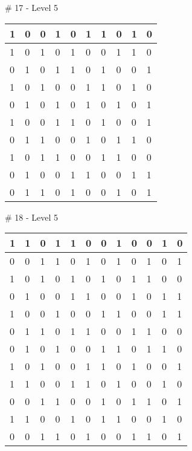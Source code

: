 \smallskip

\# 17 - Level 5 \newline
\begin{tabular}{|m{\collen}|m{\collen}|m{\collen}|m{\collen}|m{\collen}|m{\collen}|m{\collen}|m{\collen}|m{\collen}|m{\collen}|}
\hline
  1 & 0 & 0 & 1 & 0 & 1 & 1 & 0 & 1 & 0 \\
\hline
  1 & 0 & 1 & 0 & 1 & 0 & 0 & 1 & 1 & 0 \\
\hline
  0 & 1 & 0 & 1 & 1 & 0 & 1 & 0 & 0 & 1 \\
\hline
  1 & 0 & 1 & 0 & 0 & 1 & 1 & 0 & 1 & 0 \\
\hline
  0 & 1 & 0 & 1 & 0 & 1 & 0 & 1 & 0 & 1 \\
\hline
  1 & 0 & 0 & 1 & 1 & 0 & 1 & 0 & 0 & 1 \\
\hline
  0 & 1 & 1 & 0 & 0 & 1 & 0 & 1 & 1 & 0 \\
\hline
  1 & 0 & 1 & 1 & 0 & 0 & 1 & 1 & 0 & 0 \\
\hline
  0 & 1 & 0 & 0 & 1 & 1 & 0 & 0 & 1 & 1 \\
\hline
  0 & 1 & 1 & 0 & 1 & 0 & 0 & 1 & 0 & 1 \\
\hline
\end{tabular}


\smallskip

\# 18 - Level 5 \newline
\begin{tabular}{|m{\collen}|m{\collen}|m{\collen}|m{\collen}|m{\collen}|m{\collen}|m{\collen}|m{\collen}|m{\collen}|m{\collen}|m{\collen}|m{\collen}|}
\hline
  1 & 1 & 0 & 1 & 1 & 0 & 0 & 1 & 0 & 0 & 1 & 0 \\
\hline
  0 & 0 & 1 & 1 & 0 & 1 & 0 & 1 & 0 & 1 & 0 & 1 \\
\hline
  1 & 0 & 1 & 0 & 1 & 0 & 1 & 0 & 1 & 1 & 0 & 0 \\
\hline
  0 & 1 & 0 & 0 & 1 & 1 & 0 & 0 & 1 & 0 & 1 & 1 \\
\hline
  1 & 0 & 0 & 1 & 0 & 0 & 1 & 1 & 0 & 0 & 1 & 1 \\
\hline
  0 & 1 & 1 & 0 & 1 & 1 & 0 & 0 & 1 & 1 & 0 & 0 \\
\hline
  0 & 1 & 0 & 1 & 0 & 0 & 1 & 1 & 0 & 1 & 1 & 0 \\
\hline
  1 & 0 & 1 & 0 & 0 & 1 & 1 & 0 & 1 & 0 & 0 & 1 \\
\hline
  1 & 1 & 0 & 0 & 1 & 1 & 0 & 1 & 0 & 0 & 1 & 0 \\
\hline
  0 & 0 & 1 & 1 & 0 & 0 & 1 & 0 & 1 & 1 & 0 & 1 \\
\hline
  1 & 1 & 0 & 0 & 1 & 0 & 1 & 1 & 0 & 0 & 1 & 0 \\
\hline
  0 & 0 & 1 & 1 & 0 & 1 & 0 & 0 & 1 & 1 & 0 & 1 \\
\hline
\end{tabular}


